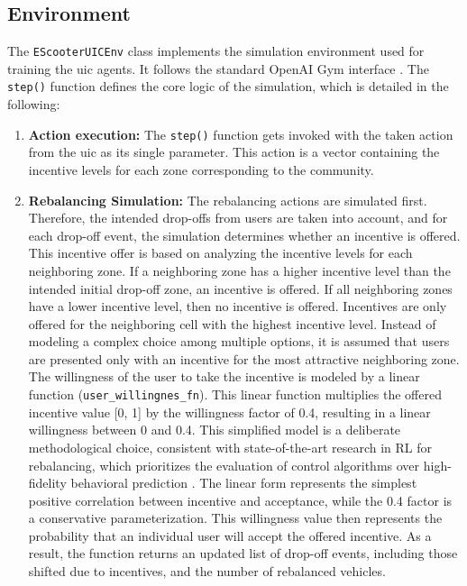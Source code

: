 \subsection{Environment}
The \texttt{EScooterUICEnv} class implements the simulation environment used for training the \gls{uic} agents.
It follows the standard OpenAI Gym interface \cite{brockman_openai_2016}.
The \texttt{step()} function defines the core logic of the simulation, which is detailed in the following:

\begin{enumerate}
    \item \textbf{Action execution:}
        The \texttt{step()} function gets invoked with the taken action from the \gls{uic} as its single parameter.
        This action is a vector containing the incentive levels for each zone corresponding to the community.
    \item \textbf{Rebalancing Simulation:}
        The rebalancing actions are simulated first.
        Therefore, the intended drop-offs from users are taken into account, and for each drop-off event, the simulation determines whether an incentive is offered.
        This incentive offer is based on analyzing the incentive levels for each neighboring zone.
        If a neighboring zone has a higher incentive level than the intended initial drop-off zone, an incentive is offered.
        If all neighboring zones have a lower incentive level, then no incentive is offered.
        Incentives are only offered for the neighboring cell with the highest incentive level.
        Instead of modeling a complex choice among multiple options, it is assumed that users are presented only with an incentive for the most attractive neighboring zone.
        The willingness of the user to take the incentive is modeled by a linear function (\texttt{user\_willingnes\_fn}).
        This linear function multiplies the offered incentive value [0, 1] by the willingness factor of 0.4, resulting in a linear willingness between 0 and 0.4.
        This simplified model is a deliberate methodological choice, consistent with state-of-the-art research in RL for rebalancing, which prioritizes the evaluation of control algorithms over high-fidelity behavioral prediction \cite{pan_deep_2019}.
        The linear form represents the simplest positive correlation between incentive and acceptance, while the 0.4 factor is a conservative parameterization.
        This willingness value then represents the probability that an individual user will accept the offered incentive.
        As a result, the function returns an updated list of drop-off events, including those shifted due to incentives, and the number of rebalanced vehicles.

\end{enumerate}
